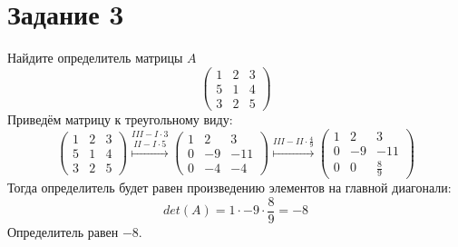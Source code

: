 \documentclass[a4paper,12pt]{article}
\begin{document}
\section*{Задание 3}
Найдите определитель матрицы $A$
$$
\begin{pmatrix}
1&2&3\\
5&1&4\\
3&2&5
\end{pmatrix}
$$
 Приведём матрицу к треугольному виду:
$$
\begin{pmatrix}
1&2&3\\
5&1&4\\
3&2&5
\end{pmatrix}
\overset{III- I \cdot 3}{\overset{II- I \cdot 5}{\longmapsto}}
\begin{pmatrix}
1&2&3\\
0&-9&-11\\
0&-4&-4
\end{pmatrix}
\overset{III- II \cdot \frac{4}{9}}{\longmapsto}
\begin{pmatrix}
1&2&3\\
0&-9&-11\\
0&0&\frac{8}{9}
\end{pmatrix}
$$
Тогда определитель будет равен произведению элементов на главной диагонали:
$$det(A)=1 \cdot -9 \cdot  \frac{8}{9} = -8$$
 Определитель равен $-8$.
\end{document}
